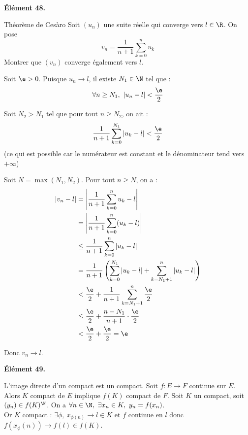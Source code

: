 \documentclass[11pt]{article}
\begin{document}
\pagebreak

\begin{center}
    \bf{Élément 48.}
\end{center}

\begin{ex}{Théorème de Cesàro}{}
    Soit $(u_n)$ une suite réelle qui converge vers $l \in \R$. On pose 
    $$v_n = \frac{1}{n+1} \sum_{k=0}^n u_k$$
    Montrer que $(v_n)$ converge également vers $l$.
    
    \tcblower
    
    Soit $ \e > 0$. Puisque $u_n \to l$, il existe $N_1 \in \N$ tel que :
    $$\forall n \geq N_1,\ |u_n - l| < \frac{ \e}{2}$$
    
    Soit $N_2 > N_1$ tel que pour tout $n \geq N_2$, on ait :
    $$\frac{1}{n+1} \sum_{k=0}^{N_1} |u_k - l| < \frac{ \e}{2}$$
    (ce qui est possible car le numérateur est constant et le dénominateur tend vers $+\infty$)
    
    Soit $N = \max(N_1, N_2)$. Pour tout $n \geq N$, on a :
    \begin{align*}
    |v_n - l| &= \left| \frac{1}{n+1} \sum_{k=0}^n u_k - l \right| \\
    &= \left| \frac{1}{n+1} \sum_{k=0}^n (u_k - l) \right| \\
    &\leq \frac{1}{n+1} \sum_{k=0}^n |u_k - l| \\
    &= \frac{1}{n+1} \left( \sum_{k=0}^{N_1} |u_k - l| + \sum_{k=N_1+1}^n |u_k - l| \right) \\
    &< \frac{ \e}{2} + \frac{1}{n+1} \sum_{k=N_1+1}^n \frac{ \e}{2} \\
    &\leq \frac{ \e}{2} + \frac{n - N_1}{n+1} \cdot \frac{ \e}{2} \\
    &< \frac{ \e}{2} + \frac{ \e}{2} =  \e
    \end{align*}
    
    Donc $v_n \to l$.
\end{ex}

\pagebreak

\begin{center}
    \bf{Élément 49.}
\end{center}

\begin{thm}{L'image directe d'un compact est un compact.}{}
    Soit $f:E\to F$ continue sur $E$. Alors $K$ compact de $E$ implique $f(K)$ compact de $F$.
    \tcblower
    Soit $K$ un compact, soit $(y_n)\in f(K)^\N$. On a $\forall n \in \N, ~ \exists x_n \in K, ~ y_n = f(x_n)$.\\
    Or $K$ compact : $\exists \phi, ~ x_{\phi(n)}\to l \in K$ et $f$ continue en $l$ donc $f(x_{\phi}(n))\to f(l) \in f(K)$.
\end{thm}
\end{document}
